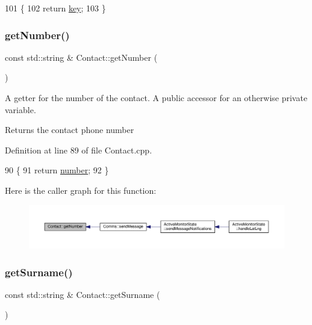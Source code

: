 \begin{DoxyCode}
101 \{
102     \textcolor{keywordflow}{return} \hyperlink{class_contact_a5bc7925e6356e29c9cbad7266f0a4340}{key};
103 \}
\end{DoxyCode}
\mbox{\label{class_contact_a612095b153e05538c32400c4c44cb1aa}} 
\subsubsection{\texorpdfstring{get\+Number()}{getNumber()}}
{\footnotesize\ttfamily const std\+::string \& Contact\+::get\+Number (\begin{DoxyParamCaption}{ }\end{DoxyParamCaption})}

A getter for the number of the contact. A public accessor for an otherwise private variable.

\begin{DoxyReturn}{Returns}
the contact phone number 
\end{DoxyReturn}


Definition at line 89 of file Contact.\+cpp.


\begin{DoxyCode}
90 \{
91     \textcolor{keywordflow}{return} \hyperlink{class_contact_abd24eed27b661da4ab20553443212437}{number};
92 \}
\end{DoxyCode}
Here is the caller graph for this function\+:
\nopagebreak
\begin{figure}[H]
\begin{center}
\leavevmode
\includegraphics[width=350pt]{dd/d2a/class_contact_a612095b153e05538c32400c4c44cb1aa_icgraph}
\end{center}
\end{figure}
\mbox{\label{class_contact_aba3d4900ea3173f38b7f296536226bb9}} 
\subsubsection{\texorpdfstring{get\+Surname()}{getSurname()}}
{\footnotesize\ttfamily const std\+::string \& Contact\+::get\+Surname (\begin{DoxyParamCaption}{ }\end{DoxyParamCaption})}

